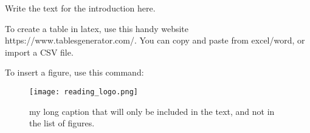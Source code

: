 

Write the text for the introduction here.

\noindent
To create a table in latex, use this handy website https://www.tablesgenerator.com/. You can copy and paste from excel/word, or import a CSV file.

\noindent
To insert a figure, use this command:
\begin{figure}[h] 
\texttt{[image: reading\_logo.png]}
\centering %
\caption[my short caption to go into the list of figures]{my long caption that will only be included in the text, and not in the list of figures.}
\end{figure}